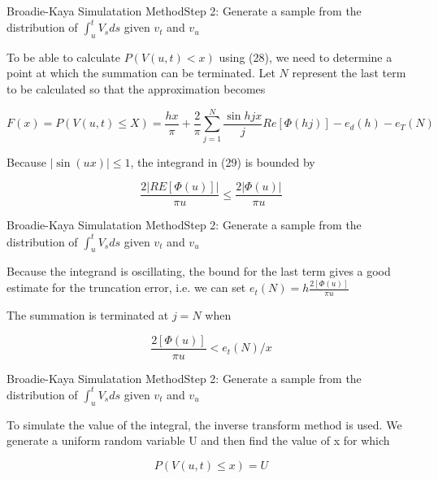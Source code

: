 \begin{frame}{Broadie-Kaya Simulatation Method}{Step 2:  Generate a sample from the distribution of $\int_{u}^t V_s ds$ given $v_t$ and $v_u$}


    To be able to calculate $P(V(u, t) < x )$ using (28), we
    need to determine a point at which the summation can be
    terminated. Let $N$ represent the last term to be calculated
    so that the approximation becomes

     \begin{equation}
        F(x) = P(V(u, t) \leq X) = \frac{hx}{\pi} + \frac{2}{\pi} \sum_{j=1}^N \frac{\sin hjx}{j} Re[\Phi(hj)] - e_d(h) - e_T(N)
    \end{equation}

    Because $|\sin(ux)| \leq 1$, the integrand in (29) is bounded by
     
    \begin{equation}
        \frac{2|RE[\Phi(u)]|}{\pi u} \leq \frac{2|\Phi(u)|}{\pi u}
    \end{equation}

    

\end{frame}

\begin{frame}{Broadie-Kaya Simulatation Method}{Step 2:  Generate a sample from the distribution of $\int_{u}^t V_s ds$ given $v_t$ and $v_u$}
    
    Because the integrand is oscillating, the bound for the last term gives a good estimate for the truncation error, i.e. we can set $e_t(N) = h \frac{2[\Phi(u)]}{\pi u} $ 
    
    The summation is terminated at $j = N$ when

    \begin{equation}
        \frac{2[\Phi(u)]}{\pi u} < e_t(N)/x
     \end{equation}
    
\end{frame}



\begin{frame}{Broadie-Kaya Simulatation Method}{Step 2:  Generate a sample from the distribution of $\int_{u}^t V_s ds$ given $v_t$ and $v_u$}

    
    To simulate the value of the integral, the inverse transform method is used. We generate a uniform random variable U and then find the value of x for which 

    \begin{equation}
        P(V(u, t) \leq x) = U
    \end{equation}

\end{frame}


